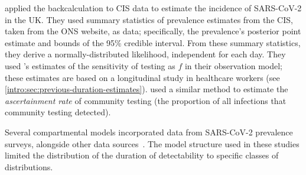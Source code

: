 \documentclass[thesis.tex]{subfiles}
\begin{document}
\Textcite{abbottCISincidence} applied the backcalculation to CIS data to estimate the incidence of SARS-CoV-2 in the UK.
They used summary statistics of prevalence estimates from the CIS, taken from the ONS website, as data; specifically, the prevalence's posterior point estimate and bounds of the 95\% credible interval.
From these summary statistics, they derive a normally-distributed likelihood, independent for each day.
They used \textcite{hellewellPCRSensitivity}'s estimates of the sensitivity of testing as $f$ in their observation model; these estimates are based on a longitudinal study in healthcare workers (see \cref{intro:sec:previous-duration-estimates}).
\Textcite{colmanAscertainment} used a similar method to estimate the \emph{ascertainment rate} of community testing (the proportion of all infections that community testing detected).

Several compartmental models incorporated data from SARS-CoV-2 prevalence surveys, alongside other data sources~\autocite{daviesAssociation,ironsEstimating,knockKey,nicholsonImproving,pooleyEstimation,birrellRTM2}.
The model structure used in these studies limited the distribution of the duration of detectability to specific classes of distributions.
\end{document}
